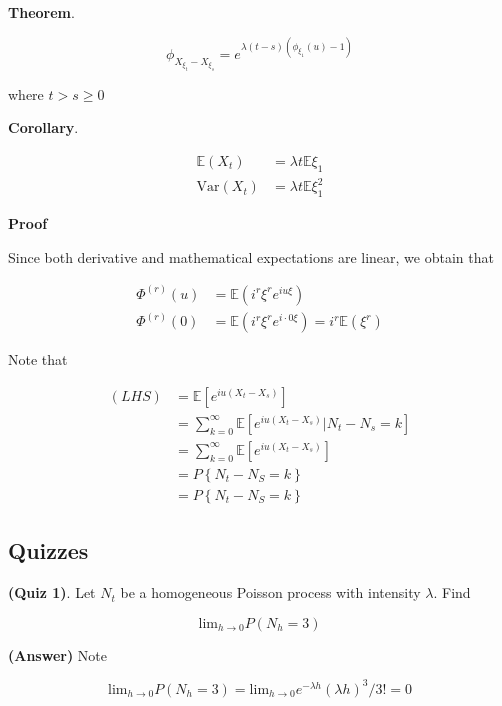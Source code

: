 \documentclass[12pt]{article}
\theoremstyle{nonumberbreak}
\begin{document}
\begin{theorem}
\textbf{Theorem}.

$$
\phi_{X_{\xi_t} - X_{\xi_s}} = e^{\lambda(t-s) \left( \phi_{\xi_1}(u) - 1 \right)}
$$

where $t > s \ge 0$

\textbf{Corollary}.

$$
\begin{aligned}
\mathbb{E}(X_t) &= \lambda t \mathbb{E} \xi_1 \\[8pt]
\mathrm{Var}(X_t) &= \lambda t \mathbb{E} \xi_1^2
\end{aligned}
$$


\end{theorem}


\textbf{Proof} 

Since both derivative and mathematical expectations are linear, we obtain that

$$
\begin{aligned}
\Phi^{(r)}(u) &= \mathbb{E}(i^r \xi^r e^{iu\xi}) \\[8pt]
\Phi^{(r)}(0) &= \mathbb{E}(i^r \xi^r e^{i\cdot 0 \xi}) = i^r \mathbb{E} (\xi^r)
\end{aligned}
$$

Note that 

$$
\begin{aligned}
(LHS) &= \mathbb{E} \left[ e^{iu (X_t - X_s)} \right] \\[8pt]
&= \sum_{k=0}^\infty \mathbb{E} \left[ e^{iu(X_t - X_s)} \vert N_t - N_s = k \right] \\[8pt]
&= \sum_{k=0}^\infty \mathbb{E} \left[ e^{iu(X_t - X_s)}\right] \\[8pt]
&= P\left\{ N_t - N_S = k \right\} \\[8pt]
&= P\left\{ N_t - N_S = k \right\} 
\end{aligned}
$$



\subsection{Quizzes}

\textbf{(Quiz 1)}. Let $N_t$ be a homogeneous Poisson process with intensity $\lambda$. Find

$$
\mathrm{lim}_{h\to0} P(N_h = 3)
$$

\textbf{(Answer)} Note

$$
\mathrm{lim}_{h\to0} P(N_h = 3) = \mathrm{lim}_{h\to0} e^{-\lambda h} (\lambda h)^3/3! = 0
$$
\end{document}
